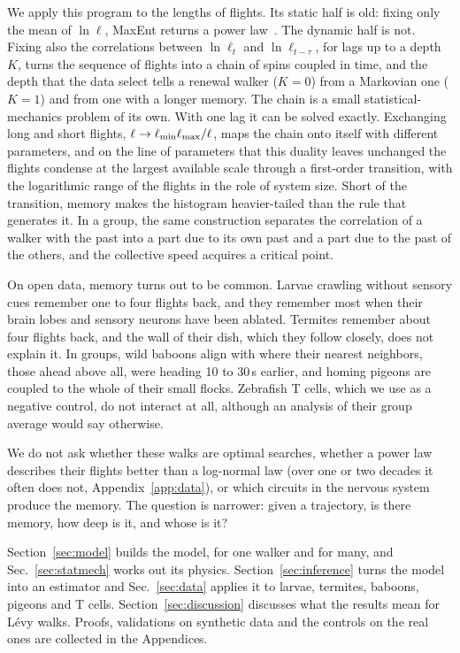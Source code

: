 We apply this program to the lengths of flights. Its static half is old: fixing only the mean of $\ln\ell$, MaxEnt returns a power law~\cite{Montroll1983}. The dynamic half is not. Fixing also the correlations between $\ln\ell_t$ and $\ln\ell_{t-\tau}$, for lags up to a depth $K$, turns the sequence of flights into a chain of spins coupled in time, and the depth that the data select tells a renewal walker ($K=0$) from a Markovian one ($K=1$) and from one with a longer memory. The chain is a small statistical-mechanics problem of its own. With one lag it can be solved exactly. Exchanging long and short flights, $\ell\to\ell_{\min}\ell_{\max}/\ell$, maps the chain onto itself with different parameters, and on the line of parameters that this duality leaves unchanged the flights condense at the largest available scale through a first-order transition, with the logarithmic range of the flights in the role of system size. Short of the transition, memory makes the histogram heavier-tailed than the rule that generates it. In a group, the same construction separates the correlation of a walker with the past into a part due to its own past and a part due to the past of the others, and the collective speed acquires a critical point.

On open data, memory turns out to be common. Larvae crawling without sensory cues remember one to four flights back, and they remember most when their brain lobes and sensory neurons have been ablated. Termites remember about four flights back, and the wall of their dish, which they follow closely, does not explain it. In groups, wild baboons align with where their nearest neighbors, those ahead above all, were heading 10 to 30\,s earlier, and homing pigeons are coupled to the whole of their small flocks. Zebrafish T cells, which we use as a negative control, do not interact at all, although an analysis of their group average would say otherwise.

We do not ask whether these walks are optimal searches, whether a power law describes their flights better than a log-normal law (over one or two decades it often does not, Appendix~\ref{app:data}), or which circuits in the nervous system produce the memory. The question is narrower: given a trajectory, is there memory, how deep is it, and whose is it?

Section~\ref{sec:model} builds the model, for one walker and for many, and Sec.~\ref{sec:statmech} works out its physics. Section~\ref{sec:inference} turns the model into an estimator and Sec.~\ref{sec:data} applies it to larvae, termites, baboons, pigeons and T cells. Section~\ref{sec:discussion} discusses what the results mean for L\'evy walks. Proofs, validations on synthetic data and the controls on the real ones are collected in the Appendices.
